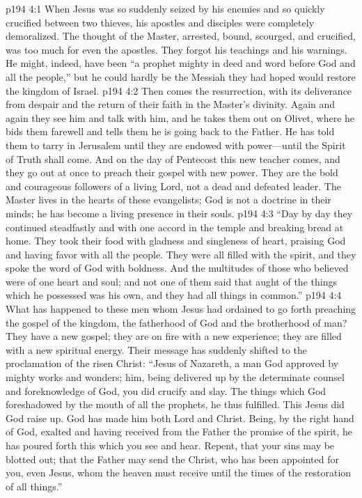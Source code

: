 \vs p194 4:1 When Jesus was so suddenly seized by his enemies and so quickly crucified between two thieves, his apostles and disciples were completely demoralized. The thought of the Master, arrested, bound, scourged, and crucified, was too much for even the apostles. They forgot his teachings and his warnings. He might, indeed, have been “a prophet mighty in deed and word before God and all the people,” but he could hardly be the Messiah they had hoped would restore the kingdom of Israel.
\vs p194 4:2 Then comes the resurrection, with its deliverance from despair and the return of their faith in the Master’s divinity. Again and again they see him and talk with him, and he takes them out on Olivet, where he bids them farewell and tells them he is going back to the Father. He has told them to tarry in Jerusalem until they are endowed with power---until the Spirit of Truth shall come. And on the day of Pentecost this new teacher comes, and they go out at once to preach their gospel with new power. They are the bold and courageous followers of a living Lord, not a dead and defeated leader. The Master lives in the hearts of these evangelists; God is not a doctrine in their minds; he has become a living presence in their souls.\plusone
\vs p194 4:3 “Day by day they continued steadfastly and with one accord in the temple and breaking bread at home. They took their food with gladness and singleness of heart, praising God and having favor with all the people. They were all filled with the spirit, and they spoke the word of God with boldness. And the multitudes of those who believed were of one heart and soul; and not one of them said that aught of the things which he possessed was his own, and they had all things in common.”
\pc \vs p194 4:4 What has happened to these men whom Jesus had ordained to go forth preaching the gospel of the kingdom, the fatherhood of God and the brotherhood of man? They have a new gospel; they are on fire with a new experience; they are filled with a new spiritual energy. Their message has suddenly shifted to the proclamation of the risen Christ: “Jesus of Nazareth, a man God approved by mighty works and wonders; him, being delivered up by the determinate counsel and foreknowledge of God, you did crucify and slay. The things which God foreshadowed by the mouth of all the prophets, he thus fulfilled. This Jesus did God raise up. God has made him both Lord and Christ. Being, by the right hand of God, exalted and having received from the Father the promise of the spirit, he has poured forth this which you see and hear. Repent, that your sins may be blotted out; that the Father may send the Christ, who has been appointed for you, even Jesus, whom the heaven must receive until the times of the restoration of all things.”
